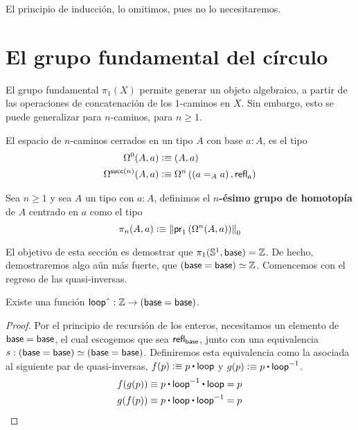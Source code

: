 \documentclass[../main.tex]{subfiles}
\begin{document}
El principio de inducci\'on, lo omitimos, pues no lo necesitaremos.

\section{El grupo fundamental del c\'irculo}\label{fgcircle}
El grupo fundamental $\pi_1(X)$ permite generar un objeto algebraico, a partir de las operaciones de concatenaci\'on de los $1$-caminos en $X$.
Sin embargo, esto se puede generalizar para $n$-caminos, para $n\geq 1$.

\begin{definition}
  El espacio de $n$-caminos cerrados en un tipo $A$ con base $a:A$, es el tipo
  \begin{align*}
    \Omega^0(A,a)         & \defeq (A, a)                                                     \\
    \Omega^{\suc(n)}(A,a) & \defeq \Omega^n\left( \left(\id[A]{a}{a}\right), \refl{a} \right)
  \end{align*}
\end{definition}

\begin{definition}
  Sea $n\geq 1$ y sea $A$ un tipo con $a:A$, definimos el \textbf{$n$-\'esimo grupo de homotop\'ia} de $A$ centrado en $a$ como el tipo
  \[ \pi_n (A,a) \defeq \trunc0{\fst \left( \Omega^n(A,a) \right)} \]
\end{definition}

El objetivo de esta secci\'on es demostrar que $\pi_1(\Sn^1, \base)=\Z$. De hecho, demostraremos algo a\'un m\'as fuerte, que $\eqv{(\base = \base)}{\Z}$.
Comencemos con el regreso de las quasi-inversas.

\begin{lemma}
  Existe una funci\'on $\lloop \string^ : \Z \to (\base = \base)$.
\end{lemma}
\begin{proof}
  Por el principio de recursi\'on de los enteros, necesitamos un elemento de $\base=\base$, el cual escogemos que sea $\refl{\base}$, junto con una equivalencia $s : \eqv{(\base=\base)}{(\base=\base)}$.
  Definiremos esta equivalencia como la asociada al siguiente par de quasi-inversas, $f(p) \defeq  p \ct \lloop$ y $g(p) \defeq p \ct \lloop^{-1}$.
  \begin{align*}
    f(g(p)) & \jdeq p \ct \lloop^{-1} \ct \lloop = p \\
    g(f(p)) & \jdeq p \ct \lloop \ct \lloop^{-1} = p
  \end{align*}
\end{proof}
\end{document}
